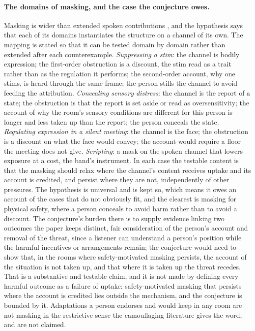 \paragraph{The domains of masking, and the case the conjecture owes.} Masking is wider than extended spoken contributions \cite{Pearson2021, Hull2019}, and the hypothesis says that each of its domains instantiates the structure on a channel of its own. The mapping is stated so that it can be tested domain by domain rather than extended after each counterexample. \emph{Suppressing a stim}: the channel is bodily expression; the first-order obstruction is a discount, the stim read as a trait rather than as the regulation it performs; the second-order account, why one stims, is heard through the same frame; the person stills the channel to avoid feeding the attribution. \emph{Concealing sensory distress}: the channel is the report of a state; the obstruction is that the report is set aside or read as oversensitivity; the account of why the room's sensory conditions are different for this person is longer and less taken up than the report; the person conceals the state. \emph{Regulating expression in a silent meeting}: the channel is the face; the obstruction is a discount on what the face would convey; the account would require a floor the meeting does not give. \emph{Scripting}: a mask on the spoken channel that lowers exposure at a cost, the band's instrument. In each case the testable content is that the masking should relax where the channel's content receives uptake and its account is credited, and persist where they are not, independently of other pressures. The hypothesis is universal and is kept so, which means it owes an account of the cases that do not obviously fit, and the clearest is masking for physical safety, where a person conceals to avoid harm rather than to avoid a discount. The conjecture's burden there is to supply evidence linking two outcomes the paper keeps distinct, fair consideration of the person's account and removal of the threat, since a listener can understand a person's position while the harmful incentives or arrangements remain; the conjecture would need to show that, in the rooms where safety-motivated masking persists, the account of the situation is not taken up, and that where it is taken up the threat recedes. That is a substantive and testable claim, and it is not made by defining every harmful outcome as a failure of uptake: safety-motivated masking that persists where the account is credited lies outside the mechanism, and the conjecture is bounded by it. Adaptations a person endorses and would keep in any room are not masking in the restrictive sense the camouflaging literature gives the word, and are not claimed.

